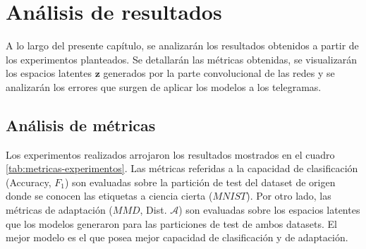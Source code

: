 \chapter{An\'alisis de resultados}

\label{Chapter4}

A lo largo del presente cap\'itulo, se analizar\'an los resultados obtenidos a partir de los experimentos planteados.
Se detallar\'an las m\'etricas obtenidas, se visualizarán los espacios latentes $\mathbf{z}$ generados por la parte
convolucional de las redes y se analizarán los errores que surgen de aplicar los modelos a los telegramas.

\section{An\'alisis de m\'etricas}

Los experimentos realizados arrojaron los resultados mostrados en el cuadro \ref{tab:metricas-experimentos}. Las
m\'etricas referidas a la capacidad de clasificaci\'on (Accuracy, $F_1$) son evaluadas sobre la partici\'on de test del
dataset de origen donde se conocen las etiquetas a ciencia cierta ($MNIST$). Por otro lado, las m\'etricas de
adaptaci\'on ($MMD$, Dist. $\mathcal{A}$) son evaluadas sobre los espacios latentes que los modelos generaron para las
particiones de test de ambos datasets. El mejor modelo es el que posea mejor capacidad de clasificaci\'on y de
adaptaci\'on.

